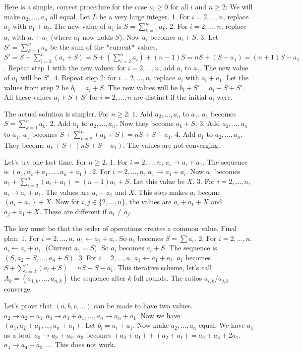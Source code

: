 Here is a simple, correct procedure for the case $a_i \ge 0$ for all $i$ and $n \ge 2$:
We will make $a_2, \dots, a_n$ all equal.
Let $L$ be a very large integer.
1.  For $i=2, \dots, n$, replace $a_1$ with $a_1+a_i$. The new value of $a_1$ is $S=\sum_{k=1}^n a_k$.
2.  For $i=2, \dots, n$, replace $a_i$ with $a_i+a_1$ (where $a_1$ now holds $S$). Now $a_i$ becomes $a_i+S$.
3.  Let $S' = \sum_{k=1}^n a_k$ be the sum of the *current* values.
    $S' = S + \sum_{i=2}^n (a_i+S) = S + (\sum_{i=2}^n a_i) + (n-1)S = nS + (S-a_1) = (n+1)S-a_1$.
    Repeat step 1 with the new values: for $i=2, \dots, n$, add $a_i$ to $a_1$.
    The new value of $a_1$ will be $S'$.
4.  Repeat step 2: for $i=2, \dots, n$, replace $a_i$ with $a_i+a_1$. Let the values from step 2 be $b_i = a_i+S$. The new values will be $b_i+S' = a_i+S+S'$. All these values $a_i+S+S'$ for $i=2, \dots, n$ are distinct if the initial $a_i$ were.

The actual solution is simpler. For $n \ge 2$:
1. Add $a_2, \dots, a_n$ to $a_1$. $a_1$ becomes $S = \sum_{k=1}^n a_k$.
2. Add $a_1$ to $a_2, \dots, a_n$. Now they become $a_k+S$.
3. Add $a_2, \dots, a_n$ to $a_1$. $a_1$ becomes $S + \sum_{k=2}^n (a_k+S) = nS + S - a_1$.
4. Add $a_1$ to $a_2, \dots, a_n$. They become $a_k+S+(nS+S-a_1)$.
The values are not converging.

Let's try one last time. For $n \ge 2$.
1. For $i=2, \dots, n$, $a_i \to a_i+a_1$. The sequence is $(a_1, a_2+a_1, \dots, a_n+a_1)$.
2. For $i=2, \dots, n$, $a_1 \to a_1+a_i$. Now $a_1$ becomes $a_1 + \sum_{i=2}^n(a_i+a_1) = (n-1)a_1+S$. Let this value be $X$.
3. For $i=2, \dots, n$, $a_i \to a_i+a_1$. The values are $a_i+a_1$ and $X$. This step makes $a_i$ become $(a_i+a_1)+X$.
Now for $i,j \in \{2, \dots, n\}$, the values are $a_i+a_1+X$ and $a_j+a_1+X$. These are different if $a_i \neq a_j$.

The key must be that the order of operations creates a common value.
Final plan:
1. For $i = 2, \dots, n$, $a_1 \leftarrow a_1+a_i$. So $a_1$ becomes $S=\sum a_i$.
2. For $i = 2, \dots, n$, $a_i \leftarrow a_i+a_1$. (Current $a_1=S$). So $a_i$ becomes $a_i+S$.
The sequence is $(S, a_2+S, \dots, a_n+S)$.
3. For $i = 2, \dots, n$, $a_1 \leftarrow a_1+a_i$. $a_1$ becomes $S+\sum_{i=2}^n(a_i+S) = nS+S-a_1$.
This iterative scheme, let's call $A_k = (a_{1,k}, \dots, a_{n,k})$ the sequence after $k$ full rounds. The ratios $a_{i,k}/a_{j,k}$ converge.

Let's prove that $(a,b,c, \dots)$ can be made to have two values.
$a_2 \to a_2+a_1, a_3 \to a_3+a_1, \dots, a_n \to a_n+a_1$.
Now we have $(a_1, a_2+a_1, \dots, a_n+a_1)$.
Let $b_i = a_i+a_1$.
Now make $a_2, \dots, a_n$ equal. We have $a_1$ as a tool.
$a_3 \to a_3+a_2$. $a_3$ becomes $(a_3+a_1)+(a_2+a_1) = a_2+a_3+2a_1$.
$a_4 \to a_4+a_2$. ...
This does not work.

